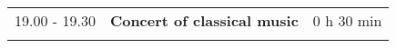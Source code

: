 \begin{longtable}{p{3cm}p{10cm}p{4cm}}
\vspace{1cm}
19.00 - 19.30 & {\bf Concert of classical music} & \hfill 0 h 30 min\\ 
\vspace{1cm}
\end{longtable}

